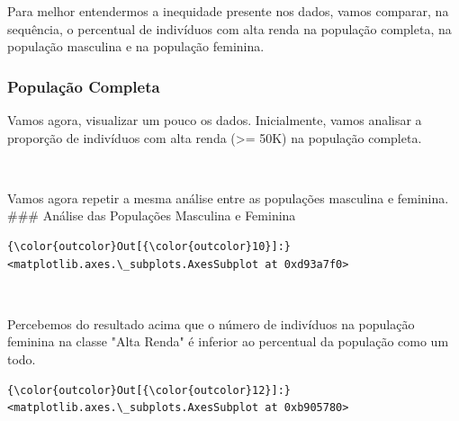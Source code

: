 \documentclass[11pt]{article}
\begin{document}
    Para melhor entendermos a inequidade presente nos dados, vamos comparar,
na sequência, o percentual de indivíduos com alta renda na população
completa, na população masculina e na população feminina.

    \subsubsection{População Completa}\label{populauxe7uxe3o-completa}

Vamos agora, visualizar um pouco os dados. Inicialmente, vamos analisar
a proporção de indivíduos com alta renda (\textgreater{}= 50K) na
população completa.

    \begin{center}
    \end{center}
    { \hspace*{\fill} \\}
    
    Vamos agora repetir a mesma análise entre as populações masculina e
feminina. \#\#\# Análise das Populações Masculina e Feminina

\begin{Verbatim}[commandchars=\\\{\}]
{\color{outcolor}Out[{\color{outcolor}10}]:} <matplotlib.axes.\_subplots.AxesSubplot at 0xd93a7f0>
\end{Verbatim}
            
    \begin{center}
    \end{center}
    { \hspace*{\fill} \\}
    
    Percebemos do resultado acima que o número de indivíduos na população
feminina na classe "Alta Renda" é inferior ao percentual da população
como um todo.

\begin{Verbatim}[commandchars=\\\{\}]
{\color{outcolor}Out[{\color{outcolor}12}]:} <matplotlib.axes.\_subplots.AxesSubplot at 0xb905780>
\end{Verbatim}
            
    \begin{center}
    \end{center}
    { \hspace*{\fill} \\}
    
\end{document}
